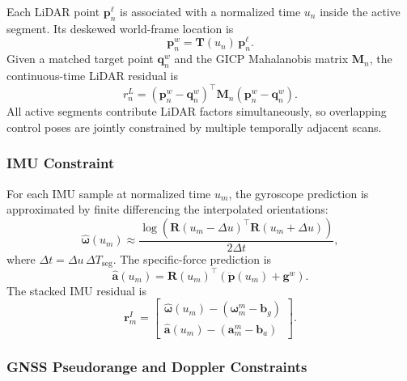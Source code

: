 \documentclass[journal]{IEEEtran}
\begin{document}
Each LiDAR point $\mathbf{p}^{\ell}_n$ is associated with a normalized time
$u_n$ inside the active segment. Its deskewed world-frame location is
\begin{equation}
\mathbf{p}^{w}_n = \mathbf{T}(u_n)\,\mathbf{p}^{\ell}_n.
\label{eq:lidar_world_point}
\end{equation}
Given a matched target point $\mathbf{q}^{w}_n$ and the GICP Mahalanobis matrix
$\mathbf{M}_n$, the continuous-time LiDAR residual is
\begin{equation}
r^{L}_n = \left(\mathbf{p}^{w}_n - \mathbf{q}^{w}_n\right)^{\top}
\mathbf{M}_n
\left(\mathbf{p}^{w}_n - \mathbf{q}^{w}_n\right).
\label{eq:lidar_residual}
\end{equation}
All active segments contribute LiDAR factors simultaneously, so overlapping
control poses are jointly constrained by multiple temporally adjacent scans.

\subsubsection{IMU Constraint}

For each IMU sample at normalized time $u_m$, the gyroscope prediction is
approximated by finite differencing the interpolated orientations:
\begin{equation}
\hat{\bm{\omega}}(u_m) \approx
\frac{
\log\!\left(
\mathbf{R}(u_m-\Delta u)^{\top}\mathbf{R}(u_m+\Delta u)
\right)
}{2\Delta t},
\label{eq:imu_gyro_pred}
\end{equation}
where $\Delta t = \Delta u \, \Delta T_{\mathrm{seg}}$.
The specific-force prediction is
\begin{equation}
\hat{\mathbf{a}}(u_m) =
\mathbf{R}(u_m)^{\top}
\left(
\ddot{\mathbf{p}}(u_m) + \mathbf{g}^w
\right).
\label{eq:imu_acc_pred}
\end{equation}
The stacked IMU residual is
\begin{equation}
\mathbf{r}^{I}_m =
\begin{bmatrix}
\hat{\bm{\omega}}(u_m) - \left(\bm{\omega}^{m}_m - \mathbf{b}_g\right) \\
\hat{\mathbf{a}}(u_m) - \left(\mathbf{a}^{m}_m - \mathbf{b}_a\right)
\end{bmatrix}.
\label{eq:imu_residual}
\end{equation}

\subsubsection{GNSS Pseudorange and Doppler Constraints}
\end{document}
